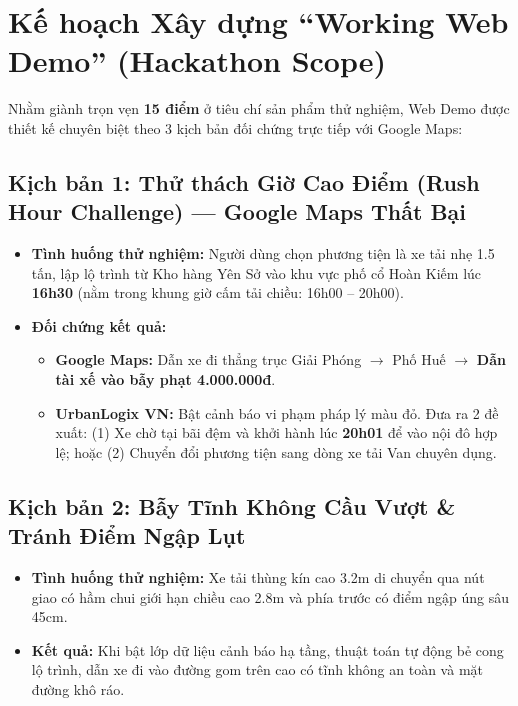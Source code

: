 \documentclass[11pt,a4paper]{article}
\begin{document}
\section{Kế hoạch Xây dựng ``Working Web Demo'' (Hackathon Scope)}

Nhằm giành trọn vẹn \textbf{15 điểm} ở tiêu chí sản phẩm thử nghiệm, Web Demo được thiết kế chuyên biệt theo 3 kịch bản đối chứng trực tiếp với Google Maps:

\subsection{Kịch bản 1: Thử thách Giờ Cao Điểm (Rush Hour Challenge) — Google Maps Thất Bại}
\begin{itemize}
  \item \textbf{Tình huống thử nghiệm:} Người dùng chọn phương tiện là xe tải nhẹ 1.5 tấn, lập lộ trình từ Kho hàng Yên Sở vào khu vực phố cổ Hoàn Kiếm lúc \textbf{16h30} (nằm trong khung giờ cấm tải chiều: 16h00 -- 20h00).
  \item \textbf{Đối chứng kết quả:}
  \begin{itemize}
    \item \textbf{Google Maps:} Dẫn xe đi thẳng trục Giải Phóng $\to$ Phố Huế $\to$ \textbf{Dẫn tài xế vào bẫy phạt 4.000.000đ}.
    \item \textbf{UrbanLogix VN:} Bật cảnh báo vi phạm pháp lý màu đỏ. Đưa ra 2 đề xuất: (1) Xe chờ tại bãi đệm và khởi hành lúc \textbf{20h01} để vào nội đô hợp lệ; hoặc (2) Chuyển đổi phương tiện sang dòng xe tải Van chuyên dụng.
  \end{itemize}
\end{itemize}

\subsection{Kịch bản 2: Bẫy Tĩnh Không Cầu Vượt \& Tránh Điểm Ngập Lụt}
\begin{itemize}
  \item \textbf{Tình huống thử nghiệm:} Xe tải thùng kín cao 3.2m di chuyển qua nút giao có hầm chui giới hạn chiều cao 2.8m và phía trước có điểm ngập úng sâu 45cm.
  \item \textbf{Kết quả:} Khi bật lớp dữ liệu cảnh báo hạ tầng, thuật toán tự động bẻ cong lộ trình, dẫn xe đi vào đường gom trên cao có tĩnh không an toàn và mặt đường khô ráo.
\end{itemize}
\end{document}
